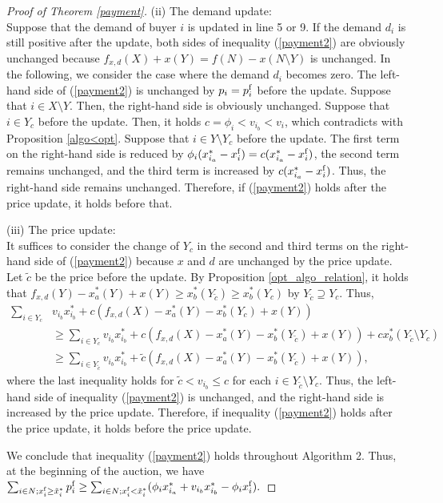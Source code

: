 \documentclass[letterpaper,11pt]{article}
\begin{document}
\begin{proof}[Proof of Theorem \ref{payment}]
	\noindent(ii) The demand update:\\
	Suppose that the demand of buyer $i$ is updated in line 5 or 9.
	If the demand $d_i$ is still positive after the update, 
	both sides of inequality (\ref{payment2}) are obviously unchanged 
	because $f_{x,d}(X)+x(Y)=f(N)-x(N\setminus Y)$ is unchanged.
	In the following, we consider the case where the demand $d_i$ becomes zero.
	The left-hand side of (\ref{payment2}) is unchanged by $p_i=p^{\rm f}_i$ before the update.
	Suppose that $i\in X\setminus Y$. Then, the right-hand side is obviously unchanged.
	Suppose that $i\in Y_c$ before the update.
	Then, it holds $c=\phi_i<v_{i_b}<v_i$, which contradicts with Proposition \ref{algo<opt}.
	Suppose that $i\in Y\setminus Y_c$ before the update.
	The first term on the right-hand side is reduced by $\phi_i(x^*_{i_a}-x^{\rm f}_i)=c(x^*_{i_a}-x^{\rm f}_i)$, 
	the second term remains unchanged, 
	and the third term is increased by $c(x^*_{i_a}-x^{\rm f}_i)$.
	Thus, the right-hand side remains unchanged.
	Therefore, if (\ref{payment2}) holds after the price update, 
	it holds before that.
	
	\noindent(iii) The price update:\\
	It suffices to consider the change of $Y_{c}$ in the second and third terms on the right-hand side of (\ref{payment2}) 
	because $x$ and $d$ are unchanged by the price update.
	Let $\tilde{c}$ be the price before the update.
	By Proposition \ref{opt_algo_relation}, it holds that 
	$f_{x,d}(Y)-x_a^*(Y)+x(Y)\geq x_b^*(Y_{\tilde{c}})\geq x_b^*(Y_{c})$ by $Y_{\tilde{c}}\supseteq Y_{c}$. 
	Thus, 
	\begin{align*}
	\sum_{i\in Y_c}&v_{i_{b}}x_{i_{b}}^*+c(f_{x,d}(X)-x_a^*(Y)-x_b^*(Y_c)+x(Y))\\
	&\geq\sum_{i\in Y_c}v_{i_{b}}x_{i_{b}}^*+c(f_{x,d}(X)-x_a^*(Y)-x_b^*(Y_{\tilde{c}})+x(Y))+c x_b^*(Y_{\tilde{c}}\setminus Y_c) \\
	&\geq\sum_{i\in Y_{\tilde{c}}}v_{i_{b}}x_{i_{b}}^*+\tilde{c}(f_{x,d}(X)-x_a^*(Y)-x_b^*(Y_{\tilde{c}})+x(Y)),
	\end{align*}
	where the last inequality holds for $\tilde{c}<v_{i_b}\leq c$ for each $i\in Y_{\tilde{c}}\setminus Y_{c}$.
	Thus, the left-hand side of inequality (\ref{payment2}) is unchanged, and the 
	right-hand side is increased by the price update. Therefore, if inequality (\ref{payment2}) holds after the price update, 
	it holds before the price update.
	
	We conclude that inequality (\ref{payment2}) holds throughout Algorithm 2.
	Thus, at the beginning of the auction, we have 
	$\sum_{i\in N; x^{\rm f}_i\geq \tilde{x}^*_i}p^{\rm f}_i\geq \sum_{i\in N; x^{\rm f}_i<\tilde{x}^*_i}
	(\phi_{i}x_{i_{a}}^*+v_{i_{b}}x_{i_{b}}^*-\phi_{i}x^{\rm f}_{i}).$
	\end{proof}
\end{document}
